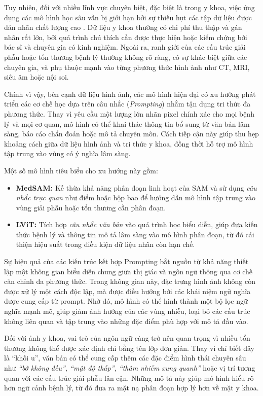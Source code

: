     Tuy nhiên, đối với nhiều lĩnh vực chuyên biệt, đặc biệt là trong y khoa, việc ứng dụng các mô hình học sâu vẫn bị giới hạn bởi sự thiếu hụt các tập dữ liệu được dán nhãn chất lượng cao \cite{li_lvit_2023}. Dữ liệu y khoa thường có chi phí thu thập và gán nhãn rất lớn, bởi quá trình chú thích cần được thực hiện hoặc kiểm chứng bởi bác sĩ và chuyên gia có kinh nghiệm. Ngoài ra, ranh giới của các cấu trúc giải phẫu hoặc tổn thương bệnh lý thường không rõ ràng, có sự khác biệt giữa các chuyên gia, và phụ thuộc mạnh vào từng phương thức hình ảnh như CT, MRI, siêu âm hoặc nội soi.
    
    Chính vì vậy, bên cạnh dữ liệu hình ảnh, các mô hình hiện đại có xu hướng phát triển các cơ chế học dựa trên câu nhắc (\textit{Prompting}) nhằm tận dụng tri thức đa phương thức. Thay vì yêu cầu một lượng lớn nhãn pixel chính xác cho mọi bệnh lý và mọi cơ quan, mô hình có thể khai thác thông tin bổ sung từ văn bản lâm sàng, báo cáo chẩn đoán hoặc mô tả chuyên môn. Cách tiếp cận này giúp thu hẹp khoảng cách giữa dữ liệu hình ảnh và tri thức y khoa, đồng thời hỗ trợ mô hình tập trung vào vùng có ý nghĩa lâm sàng.

    Một số mô hình tiêu biểu cho xu hướng này gồm:
        \begin{itemize}
            \item \textbf{MedSAM:} Kế thừa khả năng phân đoạn linh hoạt của SAM và sử dụng \textit{câu nhắc trực quan} như điểm hoặc hộp bao để hướng dẫn mô hình tập trung vào vùng giải phẫu hoặc tổn thương cần phân đoạn.
            \item \textbf{LViT:} Tích hợp \textit{câu nhắc văn bản} vào quá trình học biểu diễn, giúp đưa kiến thức bệnh lý và thông tin mô tả lâm sàng vào mô hình phân đoạn, từ đó cải thiện hiệu suất trong điều kiện dữ liệu nhãn còn hạn chế.
        \end{itemize}

    Sự hiệu quả của các kiến trúc kết hợp Prompting bắt nguồn từ khả năng thiết lập một không gian biểu diễn chung giữa thị giác và ngôn ngữ thông qua cơ chế căn chỉnh đa phương thức. Trong không gian này, đặc trưng hình ảnh không còn được xử lý một cách độc lập, mà được điều hướng bởi các khái niệm ngữ nghĩa được cung cấp từ prompt. Nhờ đó, mô hình có thể hình thành một bộ lọc ngữ nghĩa mạnh mẽ, giúp giảm ảnh hưởng của các vùng nhiễu, loại bỏ các cấu trúc không liên quan và tập trung vào những đặc điểm phù hợp với mô tả đầu vào.

    Đối với ảnh y khoa, vai trò của ngôn ngữ càng trở nên quan trọng vì nhiều tổn thương không thể được xác định chỉ bằng tên lớp đơn giản. Thay vì chỉ biết đây là ``khối u'', văn bản có thể cung cấp thêm các đặc điểm hình thái chuyên sâu như \textit{``bờ không đều'', ``mật độ thấp'', ``thâm nhiễm xung quanh''} hoặc vị trí tương quan với các cấu trúc giải phẫu lân cận. Những mô tả này giúp mô hình hiểu rõ hơn ngữ cảnh bệnh lý, từ đó đưa ra mặt nạ phân đoạn hợp lý hơn về mặt y khoa.

